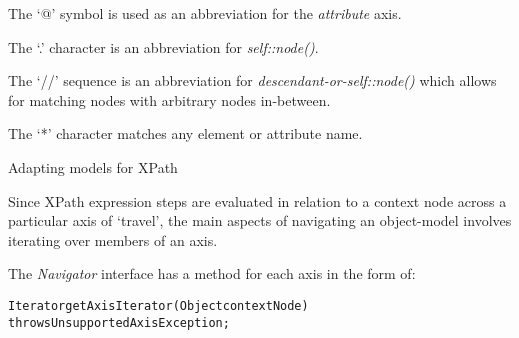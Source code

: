 \documentclass[20pt,landscape,headrule,footrule]{foils}
\begin{document}
The `@' symbol is used as an abbreviation for the \emph{attribute}
axis.




The `.' character is an abbreviation for \emph{self::node()}.


The `//' sequence is an abbreviation for
\emph{descendant-or-self::node()}
which allows for matching nodes with arbitrary nodes in-between.


The `*' character matches any element or attribute name.





\begin{center}
Adapting models for XPath
\end{center}



Since XPath expression steps are evaluated in relation to a context
node across a particular axis of `travel', the main aspects of
navigating an object-model involves iterating over members of an axis.

The \emph{Navigator} interface has a method for each axis in
the form of:

\begin{center}
\begin{minipage}{0.8\textwidth}
\small
\begin{alltt}
Iterator getAxisIterator(Object contextNode)
    throws UnsupportedAxisException;     
\end{alltt}
\end{minipage}
\end{center}
\end{document}
